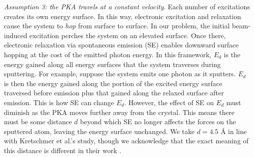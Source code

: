 \documentclass{article}
\begin{document}

\medskip\noindent
\textit{Assumption 3: the PKA travels at a constant velocity}.
Each number of excitations creates its own energy surface.  In this way,
electronic excitation and relaxation cause the system to \textit{hop} from
surface to surface.  In our problem, the initial beam-induced excitation
perches the system on an elevated surface.  Once there, electronic relaxation
via spontaneous emission (SE) enables downward surface hopping at the cost
of the emitted photon energy.
In this framework, $E_d$ is the energy gained along all energy surfaces
that the system traverses during sputtering.  For example, suppose the system
emits one photon as it sputters.  $E_d$ is then the energy gained along the
portion of the excited energy surface traversed before emission plus that
gained along the relaxed surface after emission.
This is how SE can change $E_d$.
However, the effect of SE on $E_d$ must diminish as the PKA moves further away
from the crystal.
This means there must be some distance $d$ beyond which SE no
longer affects the forces on the sputtered atom, leaving the energy surface
unchanged.
We take $d=4.5$ {\AA} in line with Kretschmer et al.'s study, though we
acknowledge that the exact meaning of this distance is different in their work
\cite{Kretschmer2020}.
\end{document}
